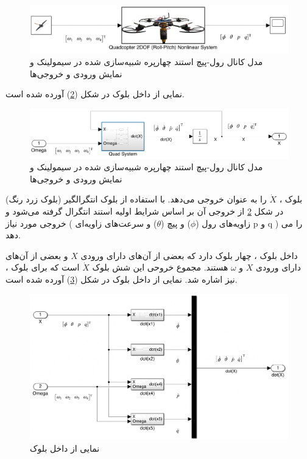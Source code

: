 \begin{figure}[H]
	\includegraphics[width=16cm]{../Figures/QuadSimulation/roll-pitch_Stand_Model.png}
	\centering
	\vspace*{-15mm}
	\caption{مدل کانال رول-پیچ استند چهارپره شبیه‌سازی شده در سیمولینک و نمایش ورودی و خروجی‌ها}
	\label{roll-pitch_quadsimulink}
\end{figure}
نمایی از داخل بلوک
در شکل (\ref{roll-pitch_Quad3DOF}) آورده شده است.
\begin{figure}[H]
	\includegraphics[width=16cm]{../Figures/QuadSimulation/roll-pitch_Integrator.png}
	\centering
	\vspace*{-15mm}
	\caption{مدل کانال رول-پیچ استند چهارپره شبیه‌سازی شده در سیمولینک و نمایش ورودی و خروجی‌ها}
	\label{roll-pitch_Quad3DOF}
\end{figure}
بلوک
،
$\dot X$ را به عنوان خروجی می‌دهد. با استفاده از بلوک انتگرالگیر (بلوک زرد رنگ) در شکل
\ref{roll-pitch_Quad3DOF}
از خروجی آن بر اساس شرایط اولیه استند انتگرال گرفته می‌شود و خروجی مورد نیاز ( زاویه‌های رول ($\phi$) و  پیچ ($\theta$) و سرعت‌های زاویه‌ای‌
p
و
q )
را می دهد.

داخل بلوک
،
چهار بلوک دارد که بعضی از آن‌های دارای ورودی $X$ و بعضی از آن‌های دارای ورودی $X$ و $\omega$ هستند. مجموع خروحی این شش بلوک $\dot X$ است که برای بلوک
،
نیز اشاره شد.
نمایی از داخل بلوک
در شکل (\ref{roll-pitch_all-six}) آورده شده است.
\begin{figure}[H]
	\includegraphics[width=16cm]{../Figures/QuadSimulation/roll-pitch_all-six.png}
	\centering
	\caption{نمایی از داخل بلوک }
	\label{roll-pitch_all-six}
\end{figure}
